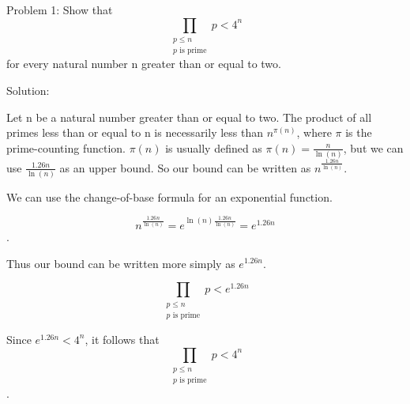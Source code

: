 Problem 1: Show that $$\prod_{\substack{p \leq n \\ p \text{ is prime}}}p < 4^n$$ for every natural number n greater than or equal to two.

Solution:

Let n be a natural number greater than or equal to two. The product of all primes less than or equal to n is necessarily less than $n^{\pi(n)}$, where $\pi$ is the prime-counting function. $\pi(n)$ is usually defined as $\pi(n) = \frac{n}{\ln(n)}$, but we can use $\frac{1.26n}{\ln(n)}$ as an upper bound. So our bound can be written as $n^{\frac{1.26n}{\ln(n)}}$.

We can use the change-of-base formula for an exponential function.

$$n^{\frac{1.26n}{\ln(n)}} = e^{\ln(n)\frac{1.26n}{\ln(n)}} = e^{1.26n}$$.

Thus our bound can be written more simply as $e^{1.26n}$.

$$ \prod_{\substack{p \leq n \\ p \text{ is prime}}}p < e^{1.26n} $$

Since $e^{1.26n} < 4^n$, it follows that $$\prod_{\substack{p \leq n \\ p \text{ is prime}}}p < 4^n$$.
